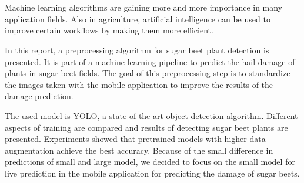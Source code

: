 \chapter{\abstractname}

Machine learning algorithms are gaining more and more importance in many application fields. Also in agriculture, artificial intelligence can be used to improve certain workflows by making them more efficient. 

In this report, a preprocessing algorithm for sugar beet plant detection is presented. It is part of a machine learning pipeline to predict the hail damage of plants in sugar beet fields. The goal of this preprocessing step is to standardize the images taken with the mobile application to improve the results of the damage prediction. 

The used model is YOLO, a state of the art object detection algorithm. Different aspects of training are compared and results of detecting sugar beet plants are presented. Experiments showed that pretrained models with higher data augmentation achieve the best accuracy. Because of the small difference in predictions of small and large model, we decided to focus on the small model for live prediction in the mobile application for predicting the damage of sugar beets.